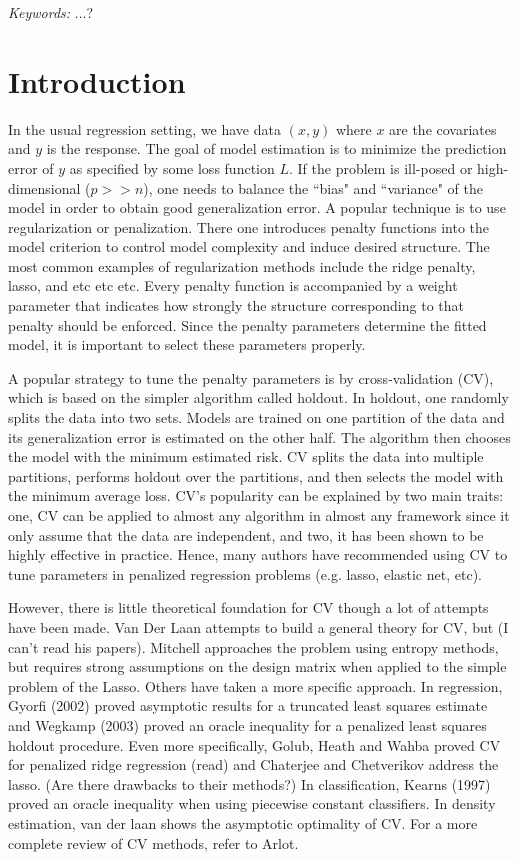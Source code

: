 \documentclass[12pt]{article}
\begin{document}
\noindent%
{\it Keywords:}  ...?
\vfill

\newpage
{} %
\section{Introduction}

In the usual regression setting, we have data $(x,y)$ where $x$ are the covariates and $y$ is the response. The goal of model estimation is to minimize the prediction error of $y$ as specified by some loss function $L$. If the problem is ill-posed or high-dimensional ($p >> n$), one needs to balance the ``bias" and ``variance" of the model in order to obtain good generalization error. A popular technique is to use regularization or penalization. There one introduces penalty functions into the model criterion to control model complexity and induce desired structure. The most common examples of regularization methods include the ridge penalty, lasso, and etc etc etc. Every penalty function is accompanied by a weight parameter that indicates how strongly the structure corresponding to that penalty should be enforced. Since the penalty parameters determine the fitted model, it is important to select these parameters properly.

A popular strategy to tune the penalty parameters is by cross-validation (CV), which is based on the simpler algorithm called holdout. In holdout, one randomly splits the data into two sets. Models are trained on one partition of the data and its generalization error is estimated on the other half. The algorithm then chooses the model with the minimum estimated risk. CV splits the data into multiple partitions, performs holdout over the partitions, and then selects the model with the minimum average loss. CV's popularity can be explained by two main traits: one, CV can be applied to almost any algorithm in almost any framework since it only assume that the data are independent, and two, it has been shown to be highly effective in practice. Hence, many authors have recommended using CV to tune parameters in penalized regression problems (e.g. lasso, elastic net, etc).

However, there is little theoretical foundation for CV though a lot of attempts have been made. Van Der Laan attempts to build a general theory for CV, but (I can't read his papers). Mitchell approaches the problem using entropy methods, but requires strong assumptions on the design matrix when applied to the simple problem of the Lasso. Others have taken a more specific approach. In regression, Gyorfi (2002) proved asymptotic results for a truncated least squares estimate and Wegkamp (2003) proved an oracle inequality for a penalized least squares holdout procedure. Even more specifically, Golub, Heath and Wahba proved CV for penalized ridge regression (read) and Chaterjee and Chetverikov address the lasso. (Are there drawbacks to their methods?) In classification, Kearns (1997) proved an oracle inequality when using piecewise constant classifiers. In density estimation, van der laan shows the asymptotic optimality of CV. For a more complete review of CV methods, refer to Arlot.
\end{document}
